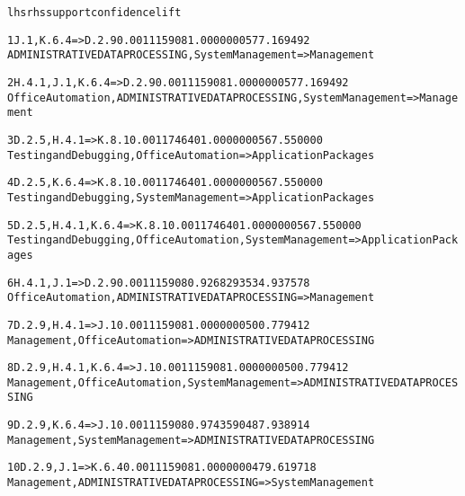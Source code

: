 \begin{alltt}\tiny
lhs                                  rhs              support      confidence    lift

1  {J.1, K.6.4}                   => {D.2.9}          0.001115908  1.0000000  577.169492
{ADMINISTRATIVE DATA PROCESSING, System Management => Management}

2  {H.4.1, J.1, K.6.4}            => {D.2.9}          0.001115908  1.0000000  577.169492
{Office Automation, ADMINISTRATIVE DATA PROCESSING, System Management => Management}

3  {D.2.5, H.4.1}                 => {K.8.1}          0.001174640  1.0000000  567.550000
{Testing and Debugging, Office Automation => Application Packages}

4  {D.2.5, K.6.4}                 => {K.8.1}          0.001174640  1.0000000  567.550000
{Testing and Debugging, System Management => Application Packages}

5  {D.2.5, H.4.1, K.6.4}          => {K.8.1}          0.001174640  1.0000000  567.550000
{Testing and Debugging, Office Automation, System Management => Application Packages}

6  {H.4.1, J.1}                   => {D.2.9}          0.001115908  0.9268293  534.937578
{Office Automation, ADMINISTRATIVE DATA PROCESSING => Management}

7  {D.2.9, H.4.1}                 => {J.1}            0.001115908  1.0000000  500.779412
{Management, Office Automation => ADMINISTRATIVE DATA PROCESSING}

8  {D.2.9, H.4.1, K.6.4}          => {J.1}            0.001115908  1.0000000  500.779412
{Management, Office Automation, System Management => ADMINISTRATIVE DATA PROCESSING}

9  {D.2.9, K.6.4}                 => {J.1}            0.001115908  0.9743590  487.938914
{Management, System Management => ADMINISTRATIVE DATA PROCESSING}

10 {D.2.9, J.1}                   => {K.6.4}          0.001115908  1.0000000  479.619718
{Management, ADMINISTRATIVE DATA PROCESSING => System Management}
\end{alltt}
